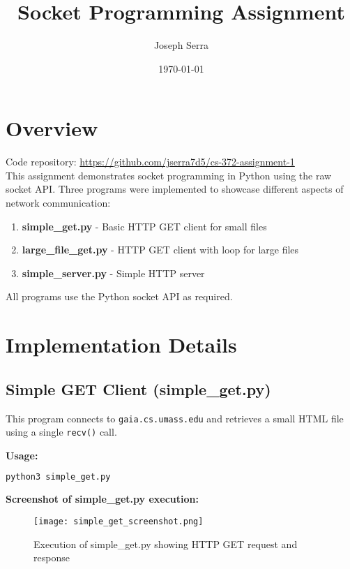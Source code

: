\documentclass[12pt]{article}
\title{Socket Programming Assignment}
\author{Joseph Serra}
\date{\today}
\begin{document}
\maketitle

\section{Overview}

Code repository: \url{https://github.com/jserra7d5/cs-372-assignment-1}\\

This assignment demonstrates socket programming in Python using the raw socket API. Three programs were implemented to showcase different aspects of network communication:

\begin{enumerate}
    \item \textbf{simple\_get.py} - Basic HTTP GET client for small files
    \item \textbf{large\_file\_get.py} - HTTP GET client with loop for large files
    \item \textbf{simple\_server.py} - Simple HTTP server
\end{enumerate}

All programs use the Python socket API as required.

\section{Implementation Details}

\subsection{Simple GET Client (simple\_get.py)}

This program connects to \texttt{gaia.cs.umass.edu} and retrieves a small HTML file using a single \texttt{recv()} call.

\textbf{Usage:}
\begin{lstlisting}[language=bash]
python3 simple_get.py
\end{lstlisting}

\textbf{Screenshot of simple\_get.py execution:}

\begin{figure}[H]
    \centering
    \texttt{[image: simple\_get\_screenshot.png]}
    \caption{Execution of simple\_get.py showing HTTP GET request and response}
    \label{fig:simple_get}
\end{figure}
\end{document}
